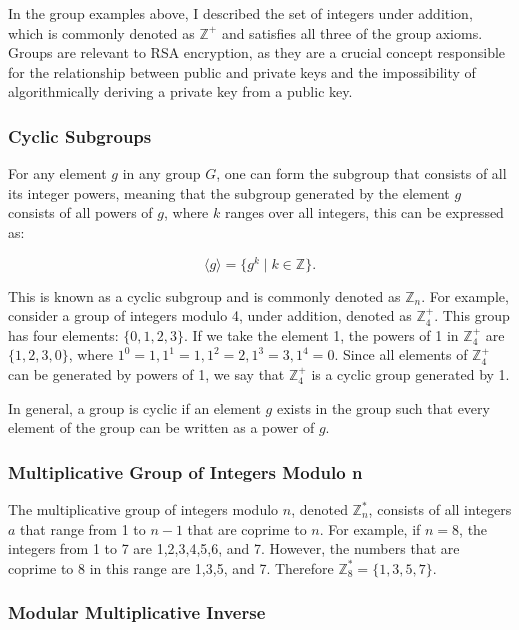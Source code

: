   In the group examples above, I described the set of integers under addition, which is commonly denoted as $\mathbb{Z}^{+}$ and satisfies all three of the group axioms. Groups are relevant to RSA encryption, as they are a crucial concept responsible for the relationship between public and private keys and the impossibility of algorithmically deriving a private key from a public key.



  \subsubsection{Cyclic Subgroups}\label{sec:section2.2.1}

  For any element $g$ in any group $G$, one can form the subgroup that consists of all its integer powers, meaning that the subgroup generated by the element $g$ consists of all powers of $g$, where $k$ ranges over all integers, this can be expressed as:
  
  $$
  \langle g \rangle = \{ g^k \mid k \in \mathbb{Z} \}.
  $$
  
  This is known as a cyclic subgroup and is commonly denoted as $\mathbb{Z}_n$. For example, consider a group of integers modulo 4, under addition, denoted as $\mathbb{Z}^{+}_{4}$. This group has four elements: $\{ 0,1,2,3 \}$. If we take the element 1, the powers of 1 in $\mathbb{Z}^{+}_{4}$ are $\{ 1,2,3,0 \}$, where $1^0 = 1, 1^1 = 1, 1^2 = 2, 1^3 = 3, 1^4 = 0$. Since all elements of $\mathbb{Z}^{+}_{4}$ can be generated by powers of 1, we say that $\mathbb{Z}^{+}_{4}$ is a cyclic group generated by 1.
  
  In general, a group is cyclic if an element $g$ exists in the group such that every element of the group can be written as a power of $g$.
  

\subsubsection{Multiplicative Group of Integers Modulo n}\label{sec:section2.2.2}
  
The multiplicative group of integers modulo $n$, denoted $\mathbb{Z}^{*}_{n}$, consists of all integers $a$ that range from 1 to $n-1$ that are coprime to $n$. For example, if $n = 8$, the integers from 1 to 7 are 1,2,3,4,5,6, and 7. However, the numbers that are coprime to 8 in this range are 1,3,5, and 7. Therefore $\mathbb{Z}^{*}_{8} = \{ 1,3,5,7 \}$.
  
\subsubsection{Modular Multiplicative Inverse}\label{sec:section2.2.3}

